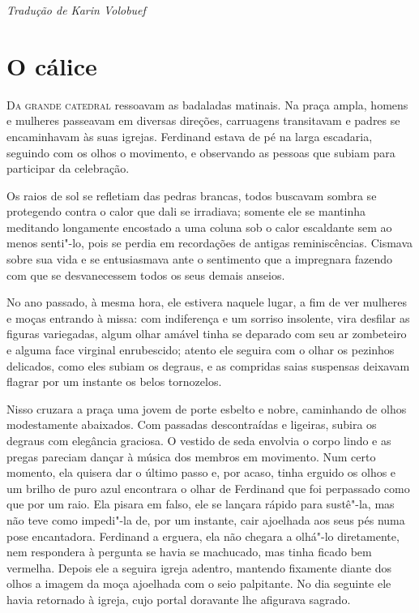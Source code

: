 \hfill\textit{Tradução de Karin Volobuef}

\chapter{O cálice}

\textsc{Da grande catedral} ressoavam as badaladas matinais. Na praça ampla,
homens e mulheres passeavam em diversas direções, carruagens
transitavam e padres se encaminhavam às suas igrejas. Ferdinand estava
de pé na larga escadaria, seguindo com os olhos o movimento, e
observando as pessoas que subiam para participar da celebração. 

Os raios de sol se refletiam das pedras brancas, todos buscavam sombra
se protegendo contra o calor que dali se irradiava; somente ele se
mantinha meditando longamente encostado a uma coluna sob o calor
escaldante sem ao menos senti"-lo, pois se perdia em recordações de
antigas reminiscências. Cismava sobre sua vida e se entusiasmava ante o
sentimento que a impregnara fazendo com que se desvanecessem todos os seus
demais anseios. 

No ano passado, à mesma hora, ele estivera naquele lugar, a fim de ver
mulheres e moças entrando à missa: com indiferença e um sorriso
insolente, vira desfilar as figuras variegadas, algum olhar amável
tinha se deparado com seu ar zombeteiro e alguma face virginal
enrubescido; atento ele seguira com o olhar os pezinhos delicados, como
eles subiam os degraus, e as compridas saias suspensas deixavam flagrar
por um instante os belos tornozelos. 

Nisso cruzara a praça uma jovem de porte esbelto e nobre, caminhando de
olhos modestamente abaixados. Com passadas descontraídas e ligeiras,
subira os degraus com elegância graciosa. O vestido de seda envolvia o
corpo lindo e as pregas pareciam dançar à música dos membros em
movimento. Num certo momento, ela quisera dar o último passo e, por
acaso, tinha erguido os olhos e um brilho de puro azul encontrara o
olhar de Ferdinand que foi perpassado como que por um raio. Ela pisara
em falso, ele se lançara rápido para sustê"-la, mas não teve como
impedi"-la de, por um instante, cair ajoelhada aos seus pés numa pose
encantadora. Ferdinand a erguera, ela não chegara a olhá"-lo
diretamente, nem respondera à pergunta se havia se machucado, mas
tinha ficado bem vermelha. Depois ele a seguira igreja adentro,
mantendo fixamente diante dos olhos a imagem da moça ajoelhada com o
seio palpitante. No dia seguinte ele havia retornado à igreja, cujo
portal doravante lhe afigurava sagrado. 

